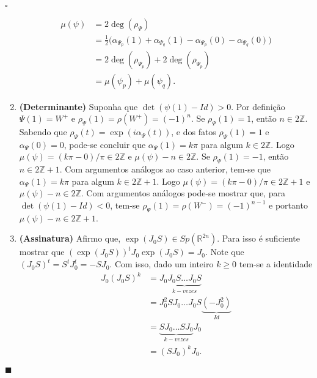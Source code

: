 \documentclass[12pt]{book}
\newenvironment{prova}[1]{$\square$ #1}{\hfill$\blacksquare$}
\newcommand{\estruturacomplexa}{J_{0}}
\newcommand{\gruposimpletico}[1]{Sp(#1)}
\newcommand{\inteiros}{\mathbb{Z}}
\newcommand{\real}[1]{\mathbb{R}^{#1}}
\begin{document}
\begin{prova}
\begin{enumerate}
			$$
			\begin{aligned}
			\mu(\psi) &= 2\deg(\rho_{\Psi}) 
			\\
			&= \frac{1}{2}\big(\alpha_{\Psi_{p}}(1)+\alpha_{\Psi_{q}}(1) -\alpha_{\Psi_{p}}(0)-\alpha_{\Psi_{q}}(0) \big) 
			\\
			&= 2\deg(\rho_{\Psi_{p}}) +2\deg(\rho_{\Psi_{p}}) 
			\\
			&=\mu(\psi_{p})+\mu(\psi_{q}).
			\end{aligned}
			$$
			
			\item \textbf{(Determinante)} Suponha que  $\det(\psi(1)- Id)>0$. Por definição $\Psi(1)=W^{+}$ e $\rho_{\Psi}(1) = \rho(W^{+}) = (-1)^{n}$. Se $\rho_{\Psi}(1) =1$, então $n\in 2\inteiros$. Sabendo que $\rho_{\Psi}(t) = \exp(i\alpha_{\Psi}(t))$, e dos fatos $\rho_{\Psi}(1) = 1$ e $\alpha_{\Psi}(0) = 0$, pode-se concluir que $\alpha_{\Psi}(1)=k\pi$ para algum $k \in 2\inteiros$. Logo $\mu(\psi) = (k\pi-0)/\pi \in 2\inteiros$ e $\mu(\psi)-n \in 2\inteiros$. Se $\rho_{\Psi}(1) =-1$, então $n\in 2\inteiros+1$. Com argumentos análogos ao caso anterior, tem-se que $\alpha_{\Psi}(1) = k\pi$ para algum $k\in 2\inteiros+1$. Logo $\mu(\psi) = (k\pi-0)/\pi \in 2\inteiros+1$ e $\mu(\psi)-n \in 2\inteiros$. Com argumentos análogos pode-se mostrar que, para $\det(\psi(1)- Id)<0$, tem-se  $\rho_{\Psi}(1) = \rho(W^{-}) = (-1)^{n-1}$ e portanto $\mu(\psi)-n \in 2\inteiros +1$.
			
			\item \textbf{(Assinatura)} Afirmo que, $\exp(\estruturacomplexa S) \in\gruposimpletico{\real{2n}}$. Para isso é suficiente mostrar que $(\exp(\estruturacomplexa S))^{t}\estruturacomplexa \exp(\estruturacomplexa S)= \estruturacomplexa$. Note que $(\estruturacomplexa S)^{t} 
			= S^{t}\estruturacomplexa^{t} = -S\estruturacomplexa$. Com isso, dado um inteiro $k\geq 0$ tem-se a identidade 
			$$
			\begin{aligned}
			\estruturacomplexa (\estruturacomplexa S)^{k} 
			&= \estruturacomplexa\underbrace{\estruturacomplexa  S\dots \estruturacomplexa S}_{k-vezes} 
			\\
			&= \estruturacomplexa^{2}  S\estruturacomplexa \dots \estruturacomplexa S \underbrace{(-\estruturacomplexa^{2})}_{Id} 
			\\
			&=\underbrace{ S\estruturacomplexa \dots  S \estruturacomplexa }_{k-vezes}\estruturacomplexa 
			\\
			&= (S\estruturacomplexa)^{k}\estruturacomplexa.
			\end{aligned}
			$$
			

\end{enumerate}
\end{prova}
\end{document}
